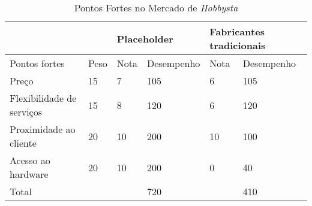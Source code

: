 \begin{table}[!htbp]
	\centering

	\begin{tabular}{ll|l|l|l|l|}
		\cline{3-6}
		&      & \multicolumn{2}{l|}{Placeholder} & \multicolumn{2}{l|}{Fabricantes tradicionais} \\ \hline
		\multicolumn{1}{|l|}{Pontos fortes}             & Peso & Nota         & Desempenho        & Nota               & Desempenho               \\ \hline
		\multicolumn{1}{|l|}{Preço}                     & 15   & 7            & 105               & 6                  & 105                      \\ \hline
		\multicolumn{1}{|l|}{Flexibilidade de serviços} & 15   & 8            & 120               & 6                  & 120                      \\ \hline
		\multicolumn{1}{|l|}{Proximidade ao cliente}    & 20   & 10           & 200               & 10                 & 100                      \\ \hline
		\multicolumn{1}{|l|}{Acesso ao hardware}        & 20   & 10           & 200               & 0                  & 40                       \\ \hline
		\multicolumn{1}{|l|}{Total}                     &      &              & 720               &                    & 410                      \\ \hline
	\end{tabular}
	\label{pontoForteHobby}
	\caption{Pontos Fortes no Mercado de \emph{Hobbysta}}
\end{table}

